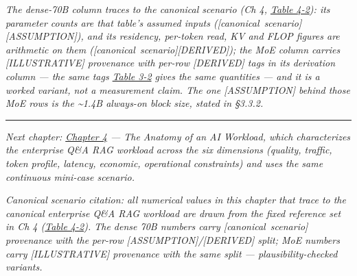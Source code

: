 \emph{The dense-70B column traces to the canonical scenario (Ch 4, \hyperref[tab:4.2]{Table 4-2}): its parameter counts are that table's assumed inputs (\mbox{{[}canonical
scenario{]}}\hspace{0pt}\mbox{{[}ASSUMPTION{]}}), and its residency, per-token read, KV and
FLOP figures are arithmetic on them (\mbox{{[}canonical
scenario{]}}\hspace{0pt}\mbox{{[}DERIVED{]}}); the MoE column carries \mbox{{[}ILLUSTRATIVE{]}}
provenance with per-row \mbox{{[}DERIVED{]}} tags in its derivation column ---
the same tags \hyperref[tab:3.2]{Table 3-2} gives the same quantities --- and it is a worked
variant, not a measurement claim. The one \mbox{{[}ASSUMPTION{]}} behind those
MoE rows is the \textasciitilde1.4B always-on block size, stated in
§3.3.2.}

\begin{center}\rule{0.5\linewidth}{0.5pt}\end{center}

\emph{Next chapter: \hyperref[chap:4]{Chapter 4} --- The Anatomy of an AI Workload, which
characterizes the enterprise Q\&A RAG workload across the six dimensions
(quality, traffic, token profile, latency, economic, operational
constraints) and uses the same continuous mini-case scenario.}

\emph{Canonical scenario citation: all numerical values in this chapter
that trace to the canonical enterprise Q\&A RAG workload are drawn from
the fixed reference set in Ch 4 (\hyperref[tab:4.2]{Table 4-2}). The dense 70B numbers carry
\mbox{{[}canonical scenario{]}} provenance with the per-row
\mbox{{[}ASSUMPTION{]}}/\mbox{{[}DERIVED{]}} split; MoE numbers carry
\mbox{{[}ILLUSTRATIVE{]}} provenance with the same split ---
plausibility-checked variants.}
